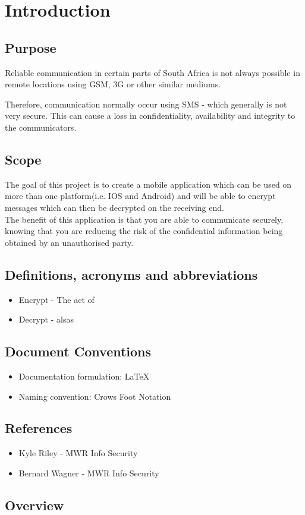 \section{Introduction}

\subsection{Purpose}%
Reliable communication in certain parts of South Africa is not always possible in remote locations using GSM, 3G or other similar mediums.

Therefore, communication normally occur using SMS - which generally is not very secure. This can cause a loss in confidentiality, availability and integrity to the communicators.

\subsection{Scope}
The goal of this project is to create a mobile application which can be used on more than one platform(i.e. IOS and Android) and will be able to encrypt messages which can then be decrypted on the receiving end. \\
\vspace{10pt}
The benefit of this application is that you are able to communicate securely, knowing that you are reducing the risk of the confidential information being obtained by an unauthorised party.



\subsection{Definitions, acronyms and abbreviations}
\begin{itemize}
\item Encrypt - The act of 
\item Decrypt - alsas
\end{itemize}

\subsection{Document Conventions}
\begin{itemize}
\item Documentation formulation: LaTeX
\item Naming convention: Crows Foot Notation
\end{itemize}

\subsection{References}
\begin{itemize}
\item{Kyle Riley - MWR Info Security}
\item{Bernard Wagner - MWR Info Security}
\end{itemize}

\subsection{Overview}